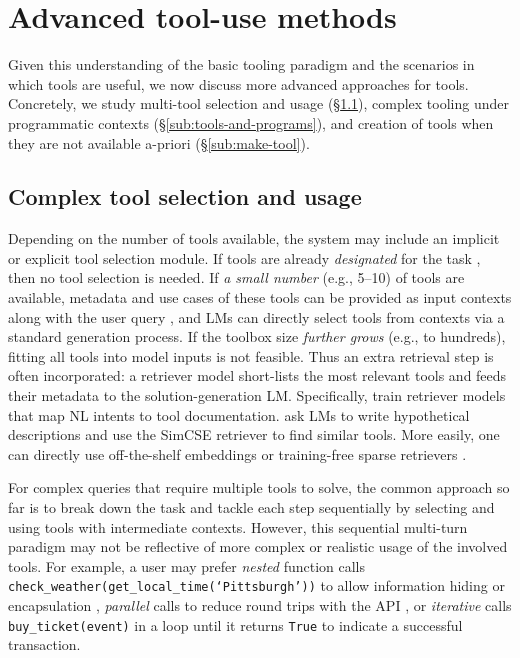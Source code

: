 \section{Advanced tool-use methods}
\label{sec:methods}

Given this understanding of the basic tooling paradigm and the scenarios in which tools are useful, we now discuss more advanced approaches for tools.
Concretely, we study multi-tool selection and usage (\S\ref{sub:tool-select}), complex tooling under programmatic contexts (\S\ref{sub:tools-and-programs}), and creation of tools when they are not available a-priori (\S\ref{sub:make-tool}). 


\subsection{Complex tool selection and usage}
\label{sub:tool-select}

Depending on the number of tools available, the system may include an implicit or explicit tool selection module.
If tools are already \textit{designated} for the task \citep{lazaridou2022internetaugmented,thoppilan2022lamda}, then no tool selection is needed.
If \textit{a small number} (e.g., 5--10) of tools are available, metadata and use cases of these tools can be provided as input contexts along with the user query \citep{schick2023toolformer,paranjape2023art}, and LMs can directly select tools from contexts via a standard generation process.
If the toolbox size \textit{further grows} (e.g., to hundreds), fitting all tools into model inputs is not feasible. Thus an extra retrieval step is often incorporated: a retriever model short-lists the most relevant tools and feeds their metadata to the solution-generation LM. Specifically, \citet{zhou2023docprompting,qin2023toolllm} train retriever models that map NL intents to tool documentation.
\citet{yuan2023craft} ask LMs to write hypothetical descriptions and use the SimCSE retriever \citep{} to find similar tools. More easily, one can directly use off-the-shelf embeddings \citep{SFRAIResearch2024,openai-emb} or training-free sparse retrievers \citep{robertson2009probabilistic}.


For complex queries that require multiple tools to solve, the common approach so far is to break down the task and tackle each step sequentially \citep{paranjape2023art} by selecting and using tools with intermediate contexts.
However, this sequential multi-turn paradigm may not be reflective of more complex or realistic usage of the involved tools. For example, a user may prefer \textit{nested} function calls \texttt{check\_weather(get\_local\_time(`Pittsburgh'))} to allow information hiding or encapsulation \citep{rogers2001encapsulation}, \textit{parallel} calls to reduce round trips with the API \citep{eleti2023function}, or \textit{iterative} calls \texttt{buy\_ticket(event)} in a loop until it returns \texttt{True} to indicate a successful transaction. 


